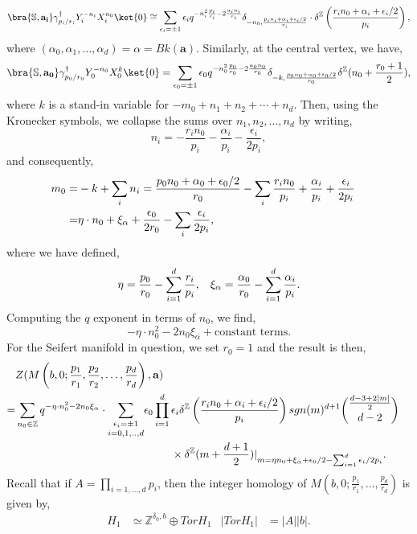 \documentclass{article}
\numberwithin{corollary}{theorem}
\numberwithin{corollary}{proposition}
\begin{document}
$$\bra{\mathbb{S},\mathbf{a_i}} \gamma_{p_i/r_i}^\dagger Y^{-n_i}_i X^{n_0}_i\ket{0} \cong  \sum_{\epsilon_i =\pm1} \epsilon_i q^{-n_i^2\frac{p_i}{r_i} -2\frac{ a_i n_i}{r_i}} \delta_{-n_0,\frac{p_i n_i+\alpha_i +\epsilon_i/2}{r_i}} \cdot \delta^\mathbb{Z} \left( \frac{r_i n_0 +\alpha_i+\epsilon_i/2}{p_i}\right),$$
where $(\alpha_0,\alpha_1,\ldots,\alpha_d) = \alpha = Bk(\mathbf{a})$. Similarly, at the central vertex, we have, 
$$\bra{\mathbb{S},\mathbf{a_0}}\gamma_{p_0/r_0}^\dagger Y^{-n_0}_0 X^{k}_0\ket{0} = \sum_{\epsilon_0 =\pm1} \epsilon_0 q^{-n_0^2\frac{p_0}{r_0} -2\frac{a_0 n_0}{r_0}} \delta_{-k,\frac{p_0 n_0+\alpha_0 +\epsilon_0/2}{r_0}} \delta^\mathbb{Z}( n_0 +\frac{r_0+1}{2}),$$
where $k$ is a stand-in variable for $-m_0 + n_1+n_2+\cdots+n_d$. Then, using the Kronecker symbols, we collapse the sums over $n_1,n_2,\ldots,n_d$ by writing,
$$n_i = -\frac{r_i n_0}{p_i}-\frac{\alpha_i}{p_i} -\frac{\epsilon_i}{2p_i},$$
and consequently,
\begin{align*}
    m_0 = & -k +\sum_i n_i = \frac{p_0 n_0+\alpha_0 +\epsilon_0/2}{r_0} - \sum_i \frac{r_i n_0}{p_i}+\frac{\alpha_i}{p_i} +\frac{\epsilon_i}{2p_i} \endline
    = & \eta \cdot n_0  +\xi_\alpha + \frac{\epsilon_0}{2r_0} -\sum_i\frac{\epsilon_i}{2p_i},
\end{align*}
where we have defined,
$$\eta = \frac{p_0}{r_0} - \sum^d_{i=1} \frac{r_i}{p_i}, \hspace{3mm} \xi_\alpha = \frac{\alpha_0}{r_0} - \sum^d_{i=1}\frac{\alpha_i}{p_i}.$$
Computing the $q$ exponent in terms of $n_0$, we find, 
$$ -\eta \cdot n^2_0 - 2n_0 \xi_\alpha + \text{constant terms}.$$
For the Seifert manifold in question, we set $r_0=1$ and the result is then,
\begin{align*}
 & Z(M\left(b,0; \frac{p_1}{r_1},\frac{p_2}{r_2},\ldots,\frac{p_d}{r_d}\right),\mathbf{a}) \endline
 =&  \sum_{n_0\in\mathbb{Z}}q^{-\eta \cdot n_0^2 - 2n_0 \xi_\alpha } \cdot \underset{i=0,1,..,d}{\sum_{\epsilon_i = \pm1}}\epsilon_0 \prod^d_{i=1}\epsilon_i\delta^\mathbb{Z} \left( \frac{r_i n_0 +\alpha_i+\epsilon_i/2}{p_i}\right)  sgn(m)^{d+1} \binom{\frac{d-3+2|m|}{2}}{d-2} \endline  & \hspace{5cm} \times  \delta^\mathbb{Z}(m+\frac{d+1}{2})|_{m = \eta n_0 + \xi_\alpha +\epsilon_0 /2 - \sum^d_{i=1}\epsilon_i/2p_i}.
\end{align*}
Recall that if $A = \prod_{i=1,\ldots,d}p_i$, then the integer homology of $M(b,0;\frac{p_1}{r_1},\ldots,\frac{p_d}{r_d})$ is given by,
\begin{align*}
  H_1 &\simeq \mathbb{Z}^{\delta_0,b}\oplus TorH_1   &  |Tor H_1| &= |A| |b|.
\end{align*}
\end{document}
